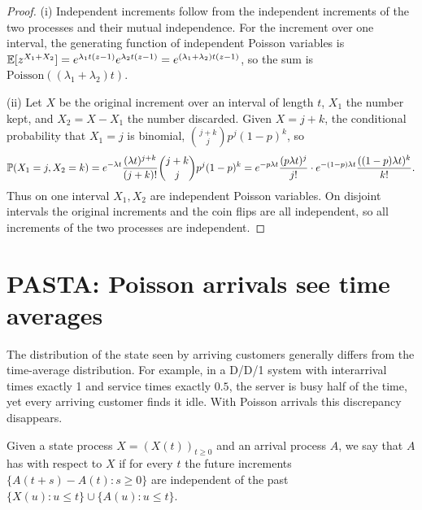 \begin{proof}
(i) Independent increments follow from the independent increments of the two
processes and their mutual independence. For the increment over one interval, the
generating function of independent Poisson variables is
$\mathbb{E}[z^{X_1+X_2}]=e^{\lambda_1t(z-1)}e^{\lambda_2t(z-1)}=e^{(\lambda_1+\lambda_2)t(z-1)}$,
so the sum is $\mathrm{Poisson}((\lambda_1+\lambda_2)t)$.

(ii) Let $X$ be the original increment over an interval of length $t$, $X_1$ the number
kept, and $X_2=X-X_1$ the number discarded. Given $X=j+k$, the conditional
probability that $X_1=j$ is binomial, $\binom{j+k}{j}p^j(1-p)^k$, so
\[
  \mathbb{P}(X_1=j,X_2=k)=e^{-\lambda t}\frac{(\lambda t)^{j+k}}{(j+k)!}\binom{j+k}{j}p^j(1-p)^k
  =e^{-p\lambda t}\frac{(p\lambda t)^j}{j!}\cdot e^{-(1-p)\lambda t}\frac{((1-p)\lambda t)^k}{k!}.
\]
Thus on one interval $X_1,X_2$ are independent Poisson variables. On disjoint
intervals the original increments and the coin flips are all independent, so all
increments of the two processes are independent.
\end{proof}


\section{PASTA: Poisson arrivals see time averages}

The distribution of the state seen by arriving customers generally differs from the
time-average distribution. For example, in a D/D/1 system with interarrival times
exactly 1 and service times exactly $0.5$, the server is busy half of the time, yet
every arriving customer finds it idle. With Poisson arrivals this discrepancy
disappears.

\begin{definition}\label{L1:def:lookahead}
Given a state process $X=(X(t))_{t\ge0}$ and an arrival process $A$, we say that $A$
has  with respect to $X$ if for every $t$ the future
increments $\{A(t+s)-A(t):s\ge0\}$ are independent of the past
$\{X(u):u\le t\}\cup\{A(u):u\le t\}$.
\end{definition}

